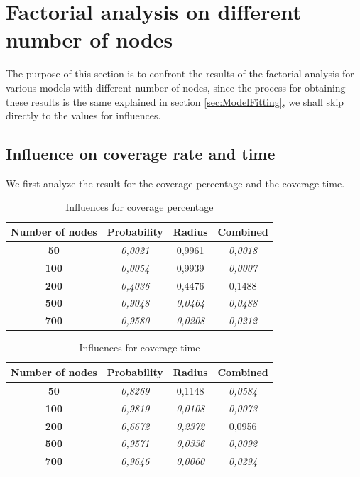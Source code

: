 \section{Factorial analysis on different number of nodes}
The purpose of this section is to confront the results of the factorial analysis for various models with different number of nodes, since the process for obtaining these results is the same explained in section \ref{sec:ModelFitting}, we shall skip directly to the values for influences.
\subsection{Influence on coverage rate and time}
We first analyze the result for the coverage percentage and the coverage time.

\begin{table}[H]
\centering
\begin{tabular}{|c|c|c|c|}
\hline
\textbf{Number of   nodes} & \textbf{Probability} & \textbf{Radius} & \textbf{Combined} \\ \hline
\textbf{50} & \textit{0,0021} & 0,9961 & \textit{0,0018} \\ \hline
\textbf{100} & \textit{0,0054} & 0,9939 & \textit{0,0007} \\ \hline
\textbf{200} & \textit{0,4036} & 0,4476 & 0,1488 \\ \hline
\textbf{500} & \textit{0,9048} & \textit{0,0464} & \textit{0,0488} \\ \hline
\textbf{700} & \textit{0,9580} & \textit{0,0208} & \textit{0,0212} \\ \hline
\end{tabular}
\caption{Influences for coverage percentage}
\label{tab:CovPercNodes}
\end{table}

\begin{table}[H]\label{tab:CovTimeNodes}
\centering
\begin{tabular}{|c|c|c|c|}
\hline
\textbf{Number of   nodes} & \textbf{Probability} & \textbf{Radius} & \textbf{Combined} \\ \hline
\textbf{50} & \textit{0,8269} & 0,1148 & \textit{0,0584} \\ \hline
\textbf{100} & \textit{0,9819} & \textit{0,0108} & \textit{0,0073} \\ \hline
\textbf{200} & \textit{0,6672} & \textit{0,2372} & 0,0956 \\ \hline
\textbf{500} & \textit{0,9571} & \textit{0,0336} & \textit{0,0092} \\ \hline
\textbf{700} & \textit{0,9646} & \textit{0,0060} & \textit{0,0294} \\ \hline
\end{tabular}
\caption{Influences for coverage time}
\end{table}


